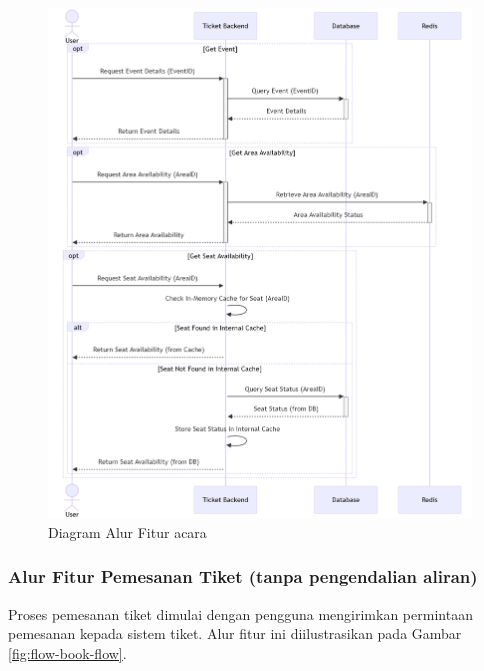 \begin{figure}[h]
    \centering
    \includegraphics[width=1\textwidth]{resources/chapter-3/event-flow.png}
    \caption{Diagram Alur Fitur acara}
    \label{fig:flow-event}
\end{figure}

\pagebreak

\subsubsection{Alur Fitur Pemesanan Tiket (tanpa pengendalian aliran)}

Proses pemesanan tiket dimulai dengan pengguna mengirimkan permintaan pemesanan kepada sistem tiket. Alur fitur ini diilustrasikan pada Gambar \ref{fig:flow-book-flow}.

